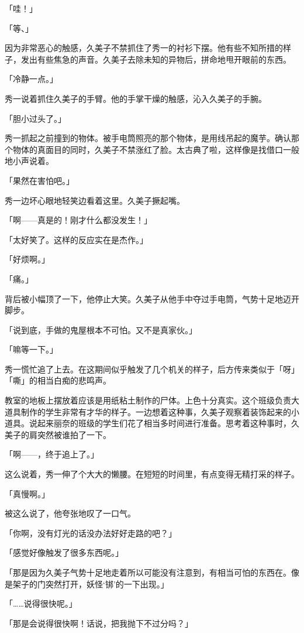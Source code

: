 \documentclass[UTF8]{ctexart}
\begin{document}
    「哇！」

    「等、」

    因为非常恶心的触感，久美子不禁抓住了秀一的衬衫下摆。他有些不知所措的样子，发出有些焦急的声音。久美子去除未知的异物后，拼命地甩开眼前的东西。

    「冷静一点。」

    秀一说着抓住久美子的手臂。他的手掌干燥的触感，沁入久美子的手腕。

    「胆小过头了。」

    秀一抓起之前撞到的物体。被手电筒照亮的那个物体，是用线吊起的魔芋。确认那个物体的真面目的同时，久美子不禁涨红了脸。太古典了啦，这样像是找借口一般地小声说着。

    「果然在害怕吧。」

    秀一边坏心眼地轻笑边看着这里。久美子撅起嘴。

    「啊——真是的！刚才什么都没发生！」

    「太好笑了。这样的反应实在是杰作。」

    「好烦啊。」

    「痛。」

    背后被小幅顶了一下，他停止大笑。久美子从他手中夺过手电筒，气势十足地迈开脚步。

    「说到底，手做的鬼屋根本不可怕。又不是真家伙。」

    「嘛等一下。」

    秀一慌忙追了上去。在这期间似乎触发了几个机关的样子，后方传来类似于「呀」「嘶」的相当白痴的悲鸣声。

    教室的地板上摆放着应该是用纸粘土制作的尸体。上色十分真实。这个班级负责大道具制作的学生非常有才华的样子。一边想着这种事，久美子观察着装饰起来的小道具。说起来丽奈的班级的学生们花了相当多时间进行准备。思考着这种事时，久美子的肩突然被谁拍了一下。

    「啊——，终于追上了。」

    这么说着，秀一伸了个大大的懒腰。在短短的时间里，有点变得无精打采的样子。

    「真慢啊。」

    被这么说了，他夸张地叹了一口气。

    「你啊，没有灯光的话没办法好好走路的吧？」

    「感觉好像触发了很多东西呢。」

    「那是因为久美子气势十足地走着所以可能没有注意到，有相当可怕的东西在。像是架子的门突然打开，妖怪‘䦁’的一下出现。」

    「……说得很快呢。」

    「那是会说得很快啊！话说，把我抛下不过分吗？」
\end{document}

